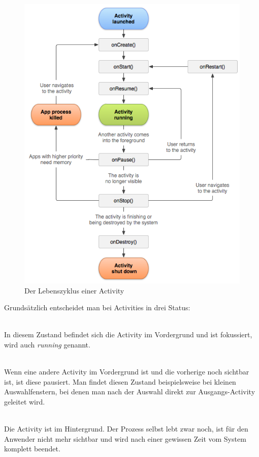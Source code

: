 \begin{figure}[ht!]
\begin{center}
\includegraphics[scale=.6]{images/activity_lifecycle}
\caption{Der Lebenszyklus einer Activity}
\label{lifecycle}
\end{center}
\end{figure}

Grundsätzlich entscheidet man bei Activities in drei Status:

\begin{description}[style=nextline]

	\item[Resumed] \hfill \\
	In diesem Zustand befindet sich die Activity im Vordergrund und ist fokussiert, wird auch \emph{running} genannt.
	
	\item[Paused] \hfill \\
	Wenn eine andere Activity im Vordergrund ist und die vorherige noch sichtbar ist, ist diese pausiert. Man findet diesen Zustand beispielsweise bei kleinen Auswahlfenstern, bei denen man nach der Auswahl direkt  zur Ausgangs-Activity geleitet wird.
	
	\item[Stopped] \hfill \\
	Die Activity ist im Hintergrund. Der Prozess selbst lebt zwar noch, ist für den Anwender nicht mehr sichtbar und wird nach einer gewissen Zeit vom System komplett beendet.
	
\end{description}

